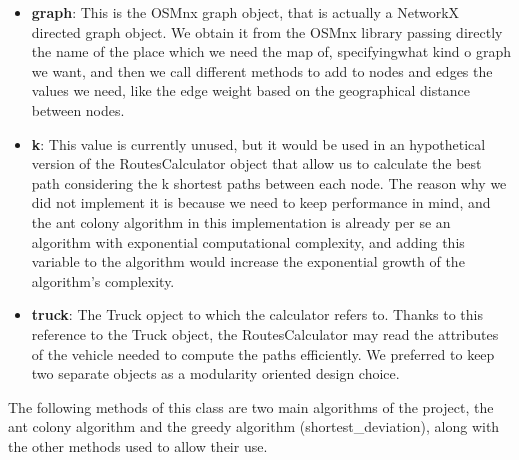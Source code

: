 \documentclass[titlepage]{article}
\begin{document}
\begin{itemize}
    \item \textbf{graph}: This is the OSMnx graph object, that is actually a NetworkX directed graph object. We obtain it from the OSMnx library passing directly the name of the place which we need the map of, specifyingwhat kind o graph we want, and then we call different methods to add to nodes and edges the values we need, like the edge weight based on the geographical distance between nodes.
    \item \textbf{k}: This value is currently unused, but it would be used in an hypothetical version of the RoutesCalculator object that allow us to calculate the best path considering the k shortest paths between each node. The reason why we did not implement it is because we need to keep performance in mind, and the ant colony algorithm in this implementation is already per se an algorithm with exponential computational complexity, and adding this variable to the algorithm would increase the exponential growth of the algorithm's complexity.
    \item \textbf{truck}: The Truck opject to which the calculator refers to. Thanks to this reference to the Truck object, the RoutesCalculator may read the attributes of the vehicle needed to compute the paths efficiently. We preferred to keep two separate objects as a modularity oriented design choice.
\end{itemize}

The following methods of this class are two main algorithms of the project, the ant colony algorithm and the greedy algorithm (shortest\_deviation), along with the other methods used to allow their use.
\end{document}

